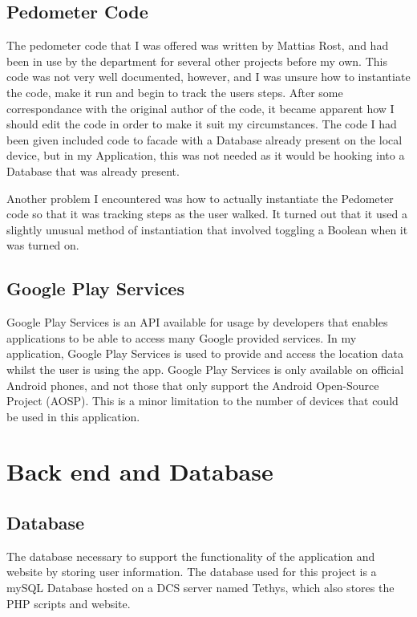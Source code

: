 \documentclass{l4proj}
\begin{document}
\subsection{Pedometer Code}

The pedometer code that I was offered was written by Mattias Rost, and had been in use by the department for several other projects before my own. This code was not very well documented, however, and I was unsure how to instantiate the code, make it run and begin to track the users steps.  After some correspondance with the original author of the code, it became apparent how I should edit the code in order to make it suit my circumstances. The code I had been given included code to facade with a Database already present on the local device, but in my Application, this was not needed as it would be hooking into a Database that was already present.

Another problem I encountered was how to actually instantiate the Pedometer code so that it was tracking steps as the user walked. It turned out that it used a slightly unusual method of instantiation that involved toggling a Boolean when it was turned on.

\subsection{Google Play Services}

Google Play Services is an API available for usage by developers that enables applications to be able to access many Google provided services. In my application, Google Play Services is used to provide and access the location data whilst the user is using the app. Google Play Services is only available on official Android phones, and not those that only support the Android Open-Source Project (AOSP). This is a minor limitation to the number of devices that could be used in this application.

\section{Back end and Database}

\subsection{Database}

The database necessary to support the functionality of the application and website by storing user information. The database used for this project is a mySQL Database hosted on a DCS server named Tethys, which also stores the PHP scripts and website.
\end{document}
